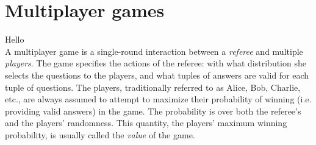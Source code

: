 \documentclass{report}
\theoremstyle{plain}
\theoremstyle{definition}
\theoremstyle{remark}
\numberwithin{equation}{subsection}
\begin{document}



\chapter{Multiplayer games}
\label{chapter:multigames}




{Hello}\\

A multiplayer game is a single-round interaction between a \emph{referee} and multiple \emph{players}. The game specifies the actions of the referee: with what distribution she selects the questions to the players, and what tuples of answers are valid for each tuple of questions. The players, traditionally referred to as Alice, Bob, Charlie, etc., are always assumed to attempt to maximize their probability of winning (i.e. providing valid answers) in the game. The probability is over both the referee's and the players' randomness. This quantity, the players' maximum winning probability, is usually called the \emph{value} of the game.
\end{document}
